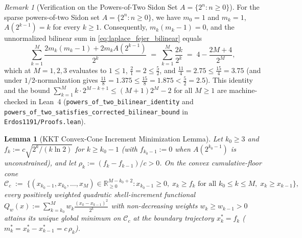 \documentclass[11pt,reqno]{amsart}
\newtheorem{lemma}{Lemma}[section]
\theoremstyle{definition}
\theoremstyle{remark}
\newtheorem{remark}{Remark}[section]
\begin{document}
\begin{remark}[Verification on the Powers-of-Two Sidon Set $A = \{2^n : n \ge 0\}$]\label{rem:powers_of_two}
For the sparse powers-of-two Sidon set $A = \{2^n : n \ge 0\}$, we have $m_0 = 1$ and $m_k = 1$, $A(2^{k-1}) = k$ for every $k \ge 1$. Consequently, $m_k(m_k - 1) = 0$, and the unnormalized bilinear sum in \eqref{eq:laplace_fejer_bilinear} equals
\[
  \sum_{k=1}^M \frac{2 m_k(m_k - 1) + 2 m_k A(2^{k-1})}{2^k} \;=\; \sum_{k=1}^M \frac{2 k}{2^k} \;=\; 4 - \frac{2M + 4}{2^M},
\]
which at $M = 1, 2, 3$ evaluates to $1 \le 1$, $\frac{2}{1} = 2 \le \frac{5}{2}$, and $\frac{11}{4} = 2.75 \le \frac{15}{4} = 3.75$ (and under $1/2$-normalization gives $\frac{11}{8} = 1.375 \le \frac{15}{8} = 1.875 < \frac{5}{2} = 2.5$). This identity and the bound $\sum_{k=1}^M k \cdot 2^{M-k+1} \le (M + 1)2^M - 2$ for all $M \ge 1$ are machine-checked in Lean~4 (\texttt{powers\_\allowbreak of\_\allowbreak two\_\allowbreak bilinear\_\allowbreak identity} and \texttt{powers\_\allowbreak of\_\allowbreak two\_\allowbreak satisfies\_\allowbreak corrected\_\allowbreak bilinear\_\allowbreak bound} in \texttt{Erdos1191/Proofs.lean}).
\end{remark}

\begin{lemma}[KKT Convex-Cone Increment Minimization Lemma]\label{lem:kkt_convex_cone}
Let $k_0 \ge 3$ and $f_k := c\sqrt{2^k / (k \ln 2)}$ for $k \ge k_0 - 1$ (with $f_{k_0-1} := 0$ when $A(2^{k_0-1})$ is unconstrained), and let $\rho_k := (f_k - f_{k-1})/c > 0$. On the convex cumulative-floor cone
\[
  \mathcal{C}_c \;:=\; \bigl\{(x_{k_0-1}, x_{k_0}, \dots, x_M) \in \mathbb{R}_{\ge 0}^{M - k_0 + 2} : x_{k_0-1} \ge 0,\; x_k \ge f_k \text{ for all } k_0 \le k \le M,\; x_k \ge x_{k-1}\bigr\},
\]
every positively weighted quadratic shell-increment functional $Q_w(x) := \sum_{k=k_0}^M w_k \frac{(x_k - x_{k-1})^2}{2^k}$ with non-decreasing weights $w_k \ge w_{k-1} > 0$ attains its unique global minimum on $\mathcal{C}_c$ at the boundary trajectory $x_k^* = f_k$ ($m_k^* = x_k^* - x_{k-1}^* = c\,\rho_k$).
\end{lemma}
\end{document}
